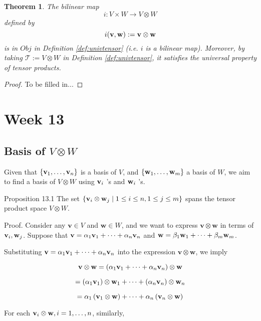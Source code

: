\documentclass[11pt]{article}
\newtheorem{theorem}{Theorem}[section]
\begin{document}
\begin{theorem} The bilinear map
$$i : V \times W \rightarrow V \otimes W$$ 
defined by 
$$i({\bf v}, {\bf w}) := {\bf v} \otimes {\bf w}$$ 
is in $Obj$ in Definition \ref{def:univtensor} (i.e. $i$ is a bilinear map). Moreover, by taking $\mathcal{T} := V \otimes W$ in Definition \ref{def:univtensor}, it satisfies the universal property of tensor products.
\end{theorem}
\begin{proof}
    To be filled in...
\end{proof}

\newpage
\section{Week 13}
\subsection{Basis of \(V \otimes  W\)}
Given that \(\left\{  {{\bf v}_1,\ldots ,{\bf v}_n}\right\}\) is a basis of \(V\), and \(\left\{  {{\bf w}_1,\ldots ,{\bf w}_{m}}\right\}\) a basis of \(W\), we aim to find a basis of \(V \otimes  W\) using \({\bf v}_{i}\) ’s and \({\bf w}_{i}\) ’s.

Proposition 13.1 The set \(\left\{  {{\bf v}_{i} \otimes  {\bf w}_{j} \mid  1 \leq  i \leq  n,1 \leq  j \leq  m}\right\}\) spans the tensor product space \(V \otimes  W\).

Proof. Consider any \(\mathbf{v} \in  V\) and \(\mathbf{w} \in  W\), and we want to express \(\mathbf{v} \otimes  \mathbf{w}\) in terms of \({\bf v}_{i},{\bf w}_{j}\). Suppose that \(\mathbf{v} = \alpha_1{\bf v}_1 + \cdots  + \alpha_n{\bf v}_n\) and \(\mathbf{w} = \beta_1{\bf w}_1 + \cdots  + \beta_{m}{\bf w}_{m}\).

Substituting \(\mathbf{v} = \alpha_1{\bf v}_1 + \cdots  + \alpha_n{\bf v}_n\) into the expression \(\mathbf{v} \otimes  \mathbf{w}\), we imply

\[
\mathbf{v} \otimes  \mathbf{w} = \left( {\alpha_1{\bf v}_1 + \cdots  + \alpha_n{\bf v}_n}\right)  \otimes  \mathbf{w}
\]

\[
= \left( {\alpha_1{\bf v}_1}\right)  \otimes  {\bf w}_1 + \cdots  + \left( {\alpha_n{\bf v}_n}\right)  \otimes  {\bf w}_n
\]

\[
= \alpha_1\left( {{\bf v}_1 \otimes  \mathbf{w}}\right)  + \cdots  + \alpha_n\left( {{\bf v}_n \otimes  \mathbf{w}}\right)
\]

For each \({\bf v}_{i} \otimes  \mathbf{w},i = 1,\ldots ,n\), similarly,
\end{document}
